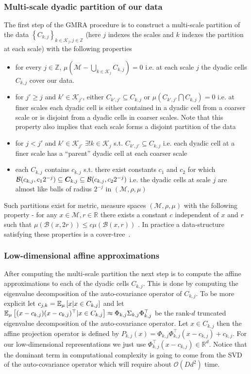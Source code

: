 \documentclass{article}
\begin{document}
  \subsubsection{Multi-scale dyadic partition of our data}
  \label{dyadic_properites}
  The first step of the GMRA procedure is to construct a multi-scale partition of the data $\left\{C_{k,j}\right\}_{k\in\mathcal{K}_j,j\in\mathbb{Z}}$ (here $j$ indexes the scales and $k$ indexes the partition at each scale) with the following properties
  \begin{itemize}
  \item for every $j\in\mathbb{Z}$, $\mu\left(\mathcal{M}-\bigcup_{k\in\mathcal{K}_j}C_{k,j}\right) = 0$ i.e. at each scale $j$ the dyadic cells $C_{k,j}$ cover our data.
  \item for $j'\geq j$ and $k'\in \mathcal{K}_{j'}$, either $C_{k',j'} \subseteq C_{k,j}$ or $\mu\left(C_{k',j'}\bigcap C_{k,j} \right) = 0$ i.e. at finer scales each dyadic cell is either contained in a dyadic cell from a coarser scale or is disjoint from a dyadic cells in coarser scales. Note that this property also implies that each scale forms a disjoint partition of the data
  \item for $j < j'$ and $k'\in \mathcal{K}_{j'}$ $\exists ! k\in\mathcal{K}_j$ s.t. $C_{k',j'} \subseteq C_{k,j}$ i.e. each dyadic cell at a finer scale has a ``parent'' dyadic cell at each coarser scale
  \item each $C_{k,j}$ contains $c_{k,j}$ s.t. there exist constants $c_1$ and $c_2$ for which $\mathcal{B}(c_{k,j},c_1 2^{-j}) \subseteq \boldsymbol{C}_{k,j} \subseteq \mathcal{B}(c_{k,j},c_2 2^{-j})$ i.e. the dyadic cells at scale $j$ are almost like balls of radius $2^{-j}$ in $\left(\mathcal{M},\rho, \mu\right)$
  \end{itemize}
  Such partitions exist for metric, measure spaces $\left(\mathcal{M},\rho, \mu\right)$ with the following property - for any $x \in \mathcal{M}, r \in \mathbb{R}$ there exists a constant $c$ independent of $x$ and $r$ such that $\mu\left(\mathcal{B}(x,2r)\right) \leq c\mu\left(\mathcal{B}(x,r)\right)$ \cite{guy1991wavelets}. In practice a data-structure satisfying these properties is a cover-tree~\cite{beygelzimer2006cover}.
  \subsubsection{Low-dimensional affine approximations}
  After computing the multi-scale partition the next step is to compute the affine approximations to each of the dyadic cells $C_{k,j}$. This is done by computing the eigenvalue decomposition of the auto-covariance operator of $C_{k,j}$. To be more explicit let $c_{j,k} = \mathbb{E}_{\mu}\left[x|x\in C_{k,j}\right]$ and let $\mathbb{E}_{\mu}\left[(x-c_{k,j})(x-c_{k,j})^{\top}|x\in C_{k,j}\right] \approx \Phi_{k,j}\Sigma_{k,j}\Phi_{k,j}^{\top}$ be the rank-$d$ truncated eigenvalue decomposition of the auto-covariance operator. Let $x \in C_{k,j}$ then the affine projection operator is defined by $P_{k,j}(x) = \Phi_{k,j}\Phi_{k,j}^{\top}(x-c_{k,j}) + c_{k,j}$. For our low-dimensional representations we just use $\Phi_{k,j}^{\top}(x-c_{k,j})\in \mathbb{R}^d$. Notice that the dominant term in computational complexity is going to come from the SVD of the auto-covariance operator which will require about $\mathcal{O}(Dd^2)$ time.
\end{document}
